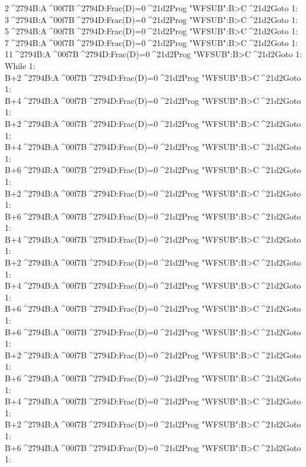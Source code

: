 \documentclass[11pt,letterpaper]{article}
\newcommand{\STO}{{\large ^^^^2794}}
\newcommand{\CBR}{{\Large ^^^^21d2}}
\newcommand{\DIV}{^^^^00f7}
\newcommand{\IDENT}[1]{\hspace*{#1\BaseIndent}}
\begin{document}
\begin{linenumbers}
2\STO B:A\DIV B\STO D:Frac(D)=0\CBR Prog "WFSUB":B>C\CBR Goto 1:\\
3\STO B:A\DIV B\STO D:Frac(D)=0\CBR Prog "WFSUB":B>C\CBR Goto 1:\\
5\STO B:A\DIV B\STO D:Frac(D)=0\CBR Prog "WFSUB":B>C\CBR Goto 1:\\
7\STO B:A\DIV B\STO D:Frac(D)=0\CBR Prog "WFSUB":B>C\CBR Goto 1:\\
11\STO B:A\DIV B\STO D:Frac(D)=0\CBR Prog "WFSUB":B>C\CBR Goto 1:\\
While 1:\\
\IDENT{1}B+2\STO B:A\DIV B\STO D:Frac(D)=0\CBR Prog "WFSUB":B>C\CBR Goto 1:\\
\IDENT{1}B+4\STO B:A\DIV B\STO D:Frac(D)=0\CBR Prog "WFSUB":B>C\CBR Goto 1:\\
\IDENT{1}B+2\STO B:A\DIV B\STO D:Frac(D)=0\CBR Prog "WFSUB":B>C\CBR Goto 1:\\
\IDENT{1}B+4\STO B:A\DIV B\STO D:Frac(D)=0\CBR Prog "WFSUB":B>C\CBR Goto 1:\\
\IDENT{1}B+6\STO B:A\DIV B\STO D:Frac(D)=0\CBR Prog "WFSUB":B>C\CBR Goto 1:\\
\IDENT{1}B+2\STO B:A\DIV B\STO D:Frac(D)=0\CBR Prog "WFSUB":B>C\CBR Goto 1:\\
\IDENT{1}B+6\STO B:A\DIV B\STO D:Frac(D)=0\CBR Prog "WFSUB":B>C\CBR Goto 1:\\
\IDENT{1}B+4\STO B:A\DIV B\STO D:Frac(D)=0\CBR Prog "WFSUB":B>C\CBR Goto 1:\\
\IDENT{1}B+2\STO B:A\DIV B\STO D:Frac(D)=0\CBR Prog "WFSUB":B>C\CBR Goto 1:\\
\IDENT{1}B+4\STO B:A\DIV B\STO D:Frac(D)=0\CBR Prog "WFSUB":B>C\CBR Goto 1:\\
\IDENT{1}B+6\STO B:A\DIV B\STO D:Frac(D)=0\CBR Prog "WFSUB":B>C\CBR Goto 1:\\
\IDENT{1}B+6\STO B:A\DIV B\STO D:Frac(D)=0\CBR Prog "WFSUB":B>C\CBR Goto 1:\\
\IDENT{1}B+2\STO B:A\DIV B\STO D:Frac(D)=0\CBR Prog "WFSUB":B>C\CBR Goto 1:\\
\IDENT{1}B+6\STO B:A\DIV B\STO D:Frac(D)=0\CBR Prog "WFSUB":B>C\CBR Goto 1:\\
\IDENT{1}B+4\STO B:A\DIV B\STO D:Frac(D)=0\CBR Prog "WFSUB":B>C\CBR Goto 1:\\
\IDENT{1}B+2\STO B:A\DIV B\STO D:Frac(D)=0\CBR Prog "WFSUB":B>C\CBR Goto 1:\\
\IDENT{1}B+6\STO B:A\DIV B\STO D:Frac(D)=0\CBR Prog "WFSUB":B>C\CBR Goto 1:\\

\end{linenumbers}
\end{document}
